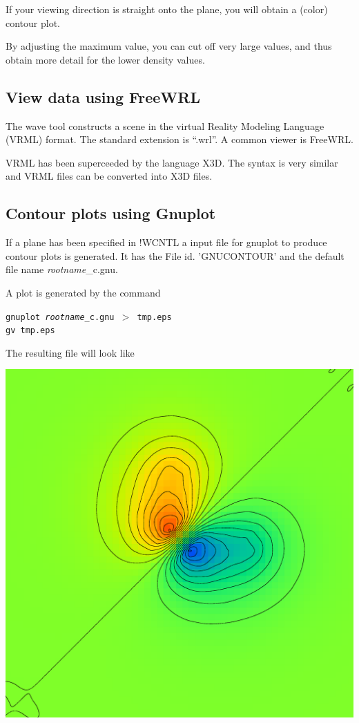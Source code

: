 \documentclass[final,12pt]{article}
\begin{document}
{{{{{{\begin{enumerate}
\begin{itemize}
  If your viewing direction is straight onto the plane, you will obtain
  a (color) contour plot.

  By adjusting the maximum value, you can cut off very large values,
  and thus obtain more detail for the lower density values.
\end{itemize}
\end{enumerate}

\subsection{View data using FreeWRL}
The wave tool constructs a scene in the virtual Reality Modeling
Language (VRML) format. The standard extension is ``.wrl''. A common
viewer is FreeWRL.

VRML has been superceeded by the language X3D. The syntax is very
similar and VRML files can be converted into X3D files.

\newpage
\subsection{Contour plots using Gnuplot}
If a plane has been specified in !WCNTL a input file for gnuplot to
produce contour plots is generated. It has the File id. 'GNUCONTOUR'
and the default file name \textit{rootname}\_c.gnu.

A plot is generated by the command
\begin{center}
\begin{minipage}{0.7\linewidth}
{\tt gnuplot {\it rootname}\_c.gnu $>$ tmp.eps}\\
{\tt gv tmp.eps}
\end{minipage}
\end{center}

The resulting file will look like
\begin{center}
\includegraphics[width=0.5\linewidth,clip=true]{Figs/gnucontour.eps}
\end{center}


}}}}}}
\end{document}
